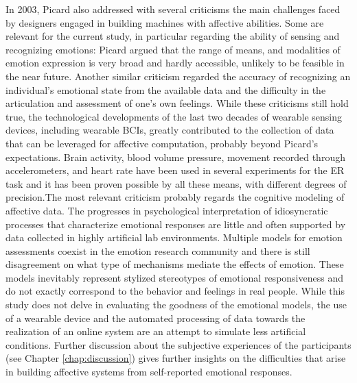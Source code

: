 In 2003, Picard also addressed with several criticisms the main challenges\cite{picard_affective_2003} faced by designers engaged in building machines with affective abilities. Some are relevant for the current study, in particular regarding the ability of sensing and recognizing emotions: Picard argued that the range of means, and modalities of emotion expression is very broad and hardly accessible, unlikely to be feasible in the near future. Another similar criticism regarded the accuracy of recognizing an individual’s emotional state from the available data and the difficulty in the articulation and assessment of one’s own feelings. While these criticisms still hold true, the technological developments of the last two decades of wearable sensing devices, including wearable \ac{BCIs}, greatly contributed to the collection of data that can be leveraged for affective computation, probably beyond Picard’s expectations. Brain activity, blood volume pressure, movement recorded through accelerometers, and heart rate have been used in several experiments for the \ac{ER} task and it has been proven possible by all these means, with different degrees of precision.The most relevant criticism probably regards the cognitive modeling of affective data. The progresses in psychological interpretation of idiosyncratic processes that characterize emotional responses are little and often supported by data collected in highly artificial lab environments. Multiple models for emotion assessments coexist in the emotion research community and there is still disagreement on what type of mechanisms mediate the effects of emotion. These models inevitably represent stylized stereotypes of emotional responsiveness and do not exactly correspond to the behavior and feelings in real people. While this study does not delve in evaluating the goodness of the emotional models, the use of a wearable device and the automated processing of data towards the realization of an online system are an attempt to simulate less artificial conditions. Further discussion about the subjective experiences of the participants (see Chapter \ref{chap:discussion}) gives further insights on the difficulties that arise in building affective systems from self-reported emotional responses.

